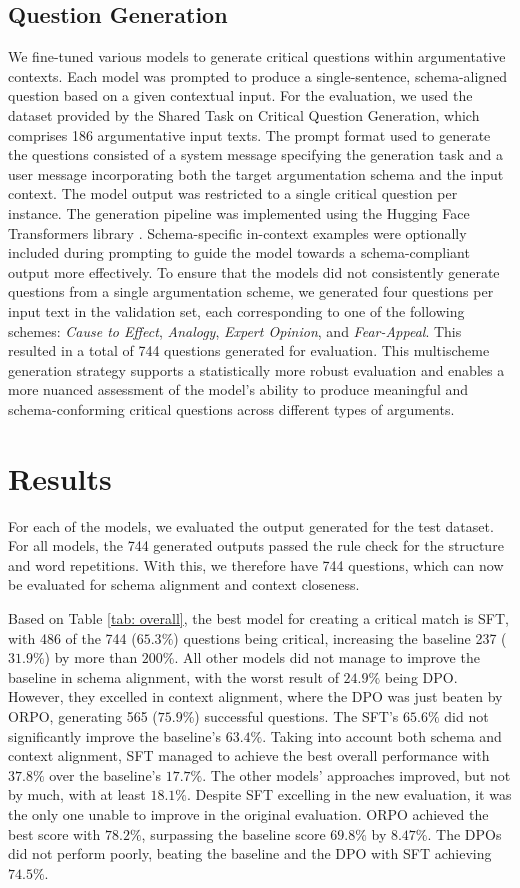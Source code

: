 \documentclass[11pt]{article}
\begin{document}
\subsection{Question Generation}
We fine-tuned various models to generate critical questions within argumentative contexts. Each model was prompted to produce a single-sentence, schema-aligned question based on a given contextual input. For the evaluation, we used the dataset provided by the Shared Task on Critical Question Generation, which comprises 186 argumentative input texts. The prompt format used to generate the questions consisted of a system message specifying the generation task and a user message incorporating both the target argumentation schema and the input context. The model output was restricted to a single critical question per instance. The generation pipeline was implemented using the Hugging Face Transformers library \citep{wolf-etal-2020-transformers}. Schema-specific in-context examples were optionally included during prompting to guide the model towards a schema-compliant output more effectively. To ensure that the models did not consistently generate questions from a single argumentation scheme, we generated four questions per input text in the validation set, each corresponding to one of the following schemes: \textit{Cause to Effect}, \textit{Analogy}, \textit{Expert Opinion}, and \textit{Fear-Appeal}. This resulted in a total of 744 questions generated for evaluation. This multischeme generation strategy supports a statistically more robust evaluation and enables a more nuanced assessment of the model's ability to produce meaningful and schema-conforming critical questions across different types of arguments.

\section{Results}
For each of the models, we evaluated the output generated for the test dataset. For all models, the 744 generated outputs passed the rule check for the structure and word repetitions. With this, we therefore have 744 questions, which can now be evaluated for schema alignment and context closeness.

Based on Table \ref{tab: overall}, the best model for creating a critical match is SFT, with 486 of the 744 ($65.3\%$) questions being critical, increasing the baseline 237 ($31.9\%$) by more than $200\%$. All other models did not manage to improve the baseline in schema alignment, with the worst result of $24.9\%$ being DPO.
However, they excelled in context alignment, where the DPO was just beaten by ORPO, generating 565 ($75.9\%$) successful questions. The SFT's $65.6\%$ did not significantly improve the baseline's $63.4\%$.
Taking into account both schema and context alignment, SFT managed to achieve the best overall performance with $37.8\%$ over the baseline's $17.7\%$. The other models' approaches improved, but not by much, with at least $18.1\%$. Despite SFT excelling in the new evaluation, it was the only one unable to improve in the original evaluation. ORPO achieved the best score with $78.2\%$, surpassing the baseline score $69.8\%$ by $8.47\%$. The DPOs did not perform poorly, beating the baseline and the DPO with SFT achieving $74.5\%$.
\end{document}
